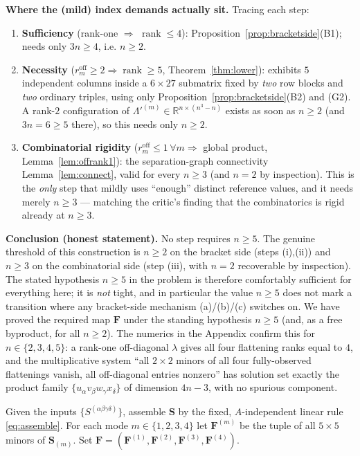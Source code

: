 \begin{remark}
\noindent\textbf{Where the (mild) index demands actually sit.} Tracing each step:
\begin{enumerate}
\item[(i)] \textbf{Sufficiency} (rank-one $\Rightarrow$ $\operatorname{rank}\le4$):
Proposition~\ref{prop:bracketside}(B1); needs only $3n\ge4$, i.e. $n\ge2$.
\item[(ii)] \textbf{Necessity} ($r_m^{\mathrm{off}}\ge2\Rightarrow\operatorname{rank}\ge5$,
Theorem~\ref{thm:lower}): exhibits $5$ independent columns inside a $6\times27$ submatrix
fixed by \emph{two} row blocks and \emph{two} ordinary triples, using only
Proposition~\ref{prop:bracketside}(B2) and (G2). A rank-$2$ configuration of
$\Lambda'^{(m)}\in\mathbb R^{n\times(n^3-n)}$ exists as soon as $n\ge2$ (and $3n=6\ge5$ there),
so this needs only $n\ge2$.
\item[(iii)] \textbf{Combinatorial rigidity} ($r_m^{\mathrm{off}}\le1\,\forall m\Rightarrow$
global product, Lemma~\ref{lem:offrank1}): the separation-graph connectivity
Lemma~\ref{lem:connect}, valid for every $n\ge3$ (and $n=2$ by inspection). This is the
\emph{only} step that mildly uses ``enough'' distinct reference values, and it needs merely
$n\ge3$ --- matching the critic's finding that the combinatorics is rigid already at $n\ge3$.
\end{enumerate}

\noindent\textbf{Conclusion (honest statement).} No step requires $n\ge5$. The genuine
threshold of this construction is $n\ge2$ on the bracket side
(steps (i),(ii)) and $n\ge3$ on the combinatorial side (step (iii), with $n=2$ recoverable by
inspection). The stated hypothesis $n\ge5$ in the problem is therefore comfortably sufficient
for everything here; it is \emph{not} tight, and in particular the value $n\ge5$ does not
mark a transition where any bracket-side mechanism (a)/(b)/(c) switches on. We have proved
the required map $\mathbf F$ under the standing hypothesis $n\ge5$ (and, as a free byproduct,
for all $n\ge2$). The numerics in the Appendix confirm this for $n\in\{2,3,4,5\}$:
a rank-one off-diagonal $\lambda$ gives all four flattening ranks equal to $4$, and the
multiplicative system ``all $2\times2$ minors of all four fully-observed flattenings vanish,
all off-diagonal entries nonzero'' has solution set exactly the product family
$\{u_\alpha v_\beta w_\gamma x_\delta\}$ of dimension $4n-3$, with no spurious component.
\end{remark}


\begin{definition}\label{def:F}
Given the inputs $\{S^{(\alpha\beta\gamma\delta)}\}$, assemble $\mathbf S$ by the fixed,
$A$-independent linear rule \eqref{eq:assemble}. For each mode $m\in\{1,2,3,4\}$ let
$\mathbf F^{(m)}$ be the tuple of all $5\times5$ minors of $\mathbf S_{(m)}$. Set
$\mathbf F=(\mathbf F^{(1)},\mathbf F^{(2)},\mathbf F^{(3)},\mathbf F^{(4)})$.
\end{definition}

